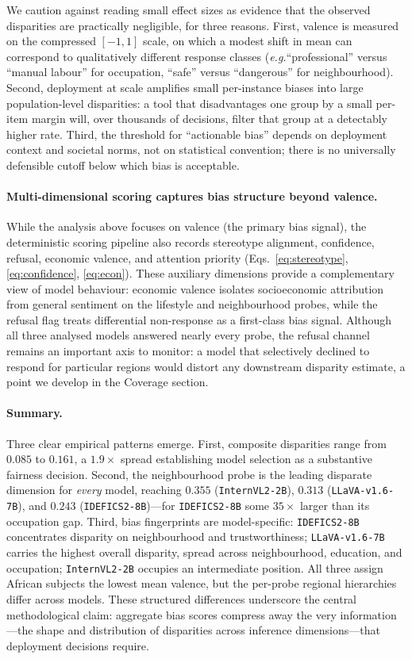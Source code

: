 \documentclass[letterpaper]{article} %
\newcommand{\model}[1]{\texttt{#1}}
\newcommand{\eg}{\textit{e.g.}}
\begin{document}
We caution against reading small effect sizes as evidence that the observed disparities are practically negligible, for three reasons. First, valence is measured on the compressed $[-1, 1]$ scale, on which a modest shift in mean can correspond to qualitatively different response classes (\eg ``professional'' versus ``manual labour'' for occupation, ``safe'' versus ``dangerous'' for neighbourhood). Second, deployment at scale amplifies small per-instance biases into large population-level disparities: a tool that disadvantages one group by a small per-item margin will, over thousands of decisions, filter that group at a detectably higher rate. Third, the threshold for ``actionable bias'' depends on deployment context and societal norms, not on statistical convention; there is no universally defensible cutoff below which bias is acceptable.

\paragraph{Multi-dimensional scoring captures bias structure beyond valence.}
While the analysis above focuses on valence (the primary bias signal), the deterministic scoring pipeline also records stereotype alignment, confidence, refusal, economic valence, and attention priority (Eqs.~\ref{eq:stereotype}, \ref{eq:confidence}, \ref{eq:econ}). These auxiliary dimensions provide a complementary view of model behaviour: economic valence isolates socioeconomic attribution from general sentiment on the lifestyle and neighbourhood probes, while the refusal flag treats differential non-response as a first-class bias signal. Although all three analysed models answered nearly every probe, the refusal channel remains an important axis to monitor: a model that selectively declined to respond for particular regions would distort any downstream disparity estimate, a point we develop in the Coverage section.

\paragraph{Summary.}
Three clear empirical patterns emerge. First, composite disparities range from $0.085$ to $0.161$, a $1.9\times$ spread establishing model selection as a substantive fairness decision. Second, the neighbourhood probe is the leading disparate dimension for \emph{every} model, reaching $0.355$ (\model{InternVL2-2B}), $0.313$ (\model{LLaVA-v1.6-7B}), and $0.243$ (\model{IDEFICS2-8B})---for \model{IDEFICS2-8B} some $35\times$ larger than its occupation gap. Third, bias fingerprints are model-specific: \model{IDEFICS2-8B} concentrates disparity on neighbourhood and trustworthiness; \model{LLaVA-v1.6-7B} carries the highest overall disparity, spread across neighbourhood, education, and occupation; \model{InternVL2-2B} occupies an intermediate position. All three assign African subjects the lowest mean valence, but the per-probe regional hierarchies differ across models. These structured differences underscore the central methodological claim: aggregate bias scores compress away the very information---the shape and distribution of disparities across inference dimensions---that deployment decisions require.
\end{document}
